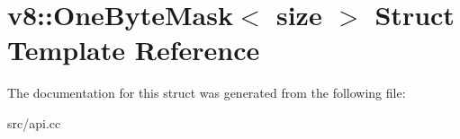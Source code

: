 \hypertarget{structv8_1_1_one_byte_mask}{}\section{v8\+:\+:One\+Byte\+Mask$<$ size $>$ Struct Template Reference}
\label{structv8_1_1_one_byte_mask}


The documentation for this struct was generated from the following file\+:\begin{DoxyCompactItemize}
\item 
src/api.\+cc\end{DoxyCompactItemize}

